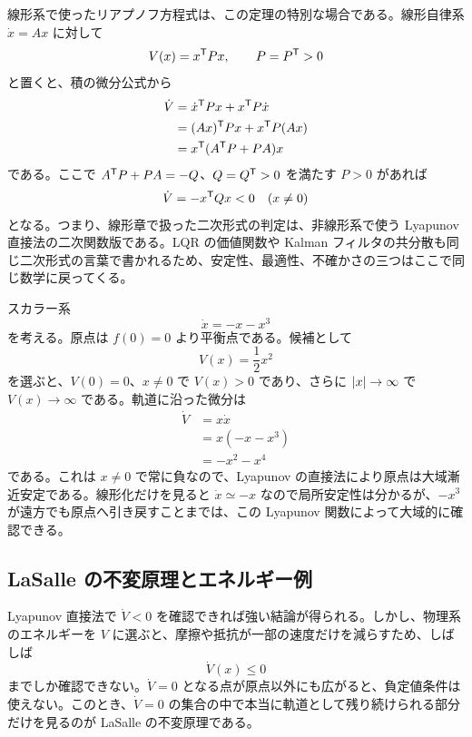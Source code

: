 線形系で使ったリアプノフ方程式は、この定理の特別な場合である。線形自律系 $\dot{x}=Ax$ に対して
\begin{equation}
  V(x)=x^{\mathsf{T}} P x,\qquad P=P^{\mathsf{T}}>0
\end{equation}
と置くと、積の微分公式から
\begin{align}
  \dot{V}
  &=\dot{x}^{\mathsf{T}} Px+x^{\mathsf{T}} P\dot{x}\\
  &=(Ax)^{\mathsf{T}} Px+x^{\mathsf{T}} P(Ax)\\
  &=x^{\mathsf{T}}(A^{\mathsf{T}} P+PA)x
\end{align}
である。ここで $A^{\mathsf{T}} P+PA=-Q$、$Q=Q^{\mathsf{T}}>0$ を満たす $P>0$ があれば
\begin{equation}
  \dot{V}=-x^{\mathsf{T}} Qx<0\quad(x\ne0)
\end{equation}
となる。つまり、線形章で扱った二次形式の判定は、非線形系で使う Lyapunov 直接法の二次関数版である。LQR の価値関数や Kalman フィルタの共分散も同じ二次形式の言葉で書かれるため、安定性、最適性、不確かさの三つはここで同じ数学に戻ってくる。

\begin{example}[スカラー非線形系の大域漸近安定性]
スカラー系
\begin{equation}
  \dot{x}=-x-x^3
\end{equation}
を考える。原点は $f(0)=0$ より平衡点である。候補として
\begin{equation}
  V(x)=\frac{1}{2}x^2
\end{equation}
を選ぶと、$V(0)=0$、$x\ne0$ で $V(x)>0$ であり、さらに $\left|x\right|\to\infty$ で $V(x)\to\infty$ である。軌道に沿った微分は
\begin{align}
  \dot{V}
  &=x\dot{x}\\
  &=x(-x-x^3)\\
  &=-x^2-x^4
\end{align}
である。これは $x\ne0$ で常に負なので、Lyapunov の直接法により原点は大域漸近安定である。線形化だけを見ると $\dot{x}\simeq -x$ なので局所安定性は分かるが、$-x^3$ が遠方でも原点へ引き戻すことまでは、この Lyapunov 関数によって大域的に確認できる。
\end{example}

\subsection{LaSalle の不変原理とエネルギー例}

Lyapunov 直接法で $\dot{V}<0$ を確認できれば強い結論が得られる。しかし、物理系のエネルギーを $V$ に選ぶと、摩擦や抵抗が一部の速度だけを減らすため、しばしば
\begin{equation}
  \dot{V}(x)\le0
\end{equation}
までしか確認できない。$\dot{V}=0$ となる点が原点以外にも広がると、負定値条件は使えない。このとき、$\dot{V}=0$ の集合の中で本当に軌道として残り続けられる部分だけを見るのが LaSalle の不変原理である。

